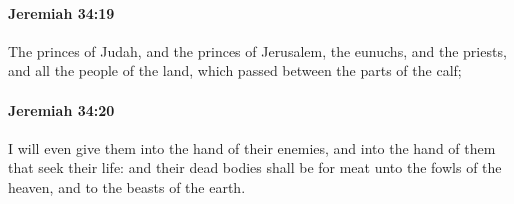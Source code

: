 		\paragraph{Jeremiah 34:19} %
			\label{JEREMIAH-34-19}

			The princes of Judah, and the princes of Jerusalem, the eunuchs, and the priests, and all the people of the land, which passed between the parts of the calf;


		\paragraph{Jeremiah 34:20} %
			\label{JEREMIAH-34-20}

			I will even give them into the hand of their enemies, and into the hand of them that seek their life: and their dead bodies shall be for meat unto the fowls of the heaven, and to the beasts of the earth.

